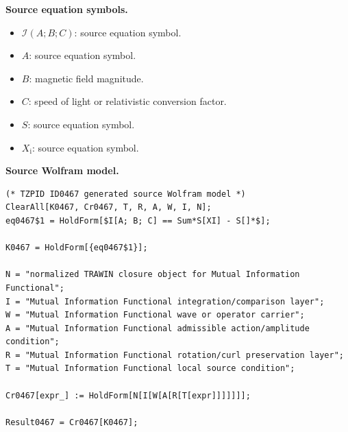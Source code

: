 \begin{minipage}[t]{0.49\linewidth}
\begingroup
\small
\raggedright
\textbf{Source equation symbols.}\par
\begin{itemize}[leftmargin=1.35em,itemsep=1pt,topsep=1pt,parsep=0pt]
    \item $\mathcal{I}(A;B;C)$: source equation symbol.
    \item $A$: source equation symbol.
    \item $B$: magnetic field magnitude.
    \item $C$: speed of light or relativistic conversion factor.
    \item $S$: source equation symbol.
    \item $X_{\mathrm{i}}$: source equation symbol.
\end{itemize}
\endgroup
\end{minipage}\hfill
\begin{minipage}[t]{0.47\linewidth}
\begingroup
\scriptsize
\raggedright
\textbf{Source Wolfram model.}\par
\begin{Verbatim}[fontsize=\tiny,breaklines=true,breakanywhere=true]
(* TZPID ID0467 generated source Wolfram model *)
ClearAll[K0467, Cr0467, T, R, A, W, I, N];
eq0467$1 = HoldForm[$I[A; B; C] == Sum*S[XI] - S[]*$];

K0467 = HoldForm[{eq0467$1}];

N = "normalized TRAWIN closure object for Mutual Information Functional";
I = "Mutual Information Functional integration/comparison layer";
W = "Mutual Information Functional wave or operator carrier";
A = "Mutual Information Functional admissible action/amplitude condition";
R = "Mutual Information Functional rotation/curl preservation layer";
T = "Mutual Information Functional local source condition";

Cr0467[expr_] := HoldForm[N[I[W[A[R[T[expr]]]]]]];

Result0467 = Cr0467[K0467];
\end{Verbatim}
\endgroup
\end{minipage}

